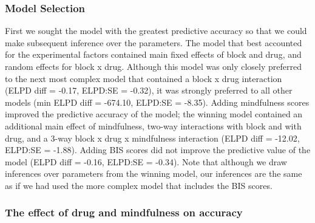 \documentclass{article}
\begin{document}
\hypertarget{model-selection}{%
\subsubsection{Model Selection}\label{model-selection}}

First we sought the model with the greatest predictive accuracy so that
we could make subsequent inference over the parameters. The model that
best accounted for the experimental factors contained main fixed effects
of block and drug, and random effects for block x drug. Although this
model was only closely preferred to the next most complex model that
contained a block x drug interaction (ELPD diff = -0.17, ELPD:SE =
-0.32), it was strongly preferred to all other models (min ELPD diff =
-674.10, ELPD:SE = -8.35). Adding mindfulness scores improved the
predictive accuracy of the model; the winning model contained an
additional main effect of mindfulness, two-way interactions with block
and with drug, and a 3-way block x drug x mindfulness interaction (ELPD
diff = -12.02, ELPD:SE = -1.88). Adding BIS scores did not improve the
predictive value of the model (ELPD diff = -0.16, ELPD:SE = -0.34). Note
that although we draw inferences over parameters from the winning model,
our inferences are the same as if we had used the more complex model
that includes the BIS scores.

\hypertarget{the-effect-of-drug-and-mindfulness-on-accuracy}{%
\subsubsection{The effect of drug and mindfulness on
accuracy}\label{the-effect-of-drug-and-mindfulness-on-accuracy}}
\end{document}
